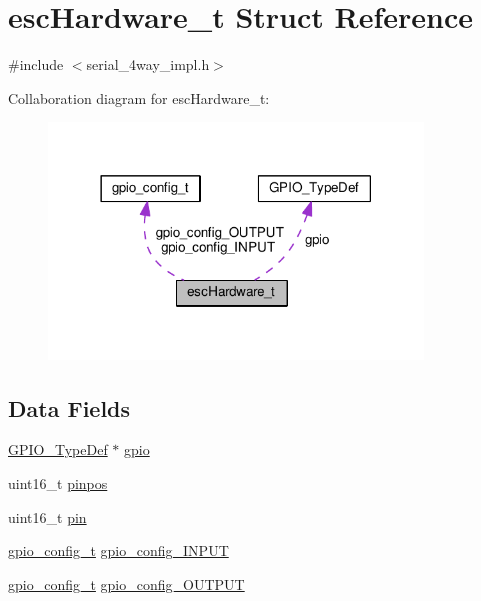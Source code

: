 \hypertarget{structescHardware__t}{\section{esc\+Hardware\+\_\+t Struct Reference}
\label{structescHardware__t}
}


{\ttfamily \#include $<$serial\+\_\+4way\+\_\+impl.\+h$>$}



Collaboration diagram for esc\+Hardware\+\_\+t\+:\nopagebreak
\begin{figure}[H]
\begin{center}
\leavevmode
\includegraphics[width=282pt]{structescHardware__t__coll__graph}
\end{center}
\end{figure}
\subsection*{Data Fields}
\begin{DoxyCompactItemize}
\item 
\hyperlink{structGPIO__TypeDef}{G\+P\+I\+O\+\_\+\+Type\+Def} $\ast$ \hyperlink{structescHardware__t_af1e2d02487b679ff58901f36db0d97d9}{gpio}
\item 
uint16\+\_\+t \hyperlink{structescHardware__t_a4b5a825fafe0a4a53b1440e427c64df2}{pinpos}
\item 
uint16\+\_\+t \hyperlink{structescHardware__t_a3858440c5b0fb003c2bdb102b6a64efd}{pin}
\item 
\hyperlink{structgpio__config__t}{gpio\+\_\+config\+\_\+t} \hyperlink{structescHardware__t_a903bb73901dddb9f5730579006e74772}{gpio\+\_\+config\+\_\+\+I\+N\+P\+U\+T}
\item 
\hyperlink{structgpio__config__t}{gpio\+\_\+config\+\_\+t} \hyperlink{structescHardware__t_afe34748d0d5940a9b76a64cbde96a2d5}{gpio\+\_\+config\+\_\+\+O\+U\+T\+P\+U\+T}
\end{DoxyCompactItemize}



